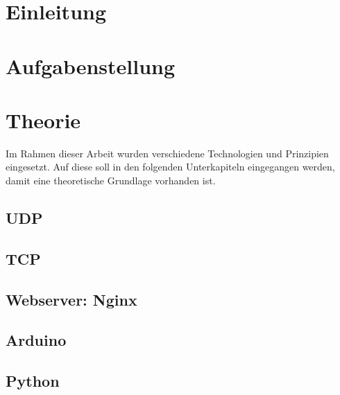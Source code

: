 \documentclass[ngerman]{scrartcl} %
\begin{document}
\tableofcontents
\newpage
 
\section{Einleitung}        
\label{sec:Einleitung-1}   

    

\newpage

\section{Aufgabenstellung}
\label{sec:Aufgabenstellung-1}



\newpage

\section{Theorie}        
\label{sec:Theorie-1}  

Im Rahmen dieser Arbeit wurden verschiedene Technologien und Prinzipien eingesetzt. Auf diese soll in den folgenden Unterkapiteln eingegangen werden, damit eine theoretische Grundlage vorhanden ist. 

\subsection{\ac{UDP}}
\label{sec:UDP-1}



\subsection{\ac{TCP}}
\label{sec:TCP-1}



\subsection{Webserver: Nginx}
\label{sec:Webserver: Nginx-1} 
 
\subsection{Arduino}
\label{sec:Arduino-1} 



\subsection{Python}
\label{src:Python-1}
\end{document}
